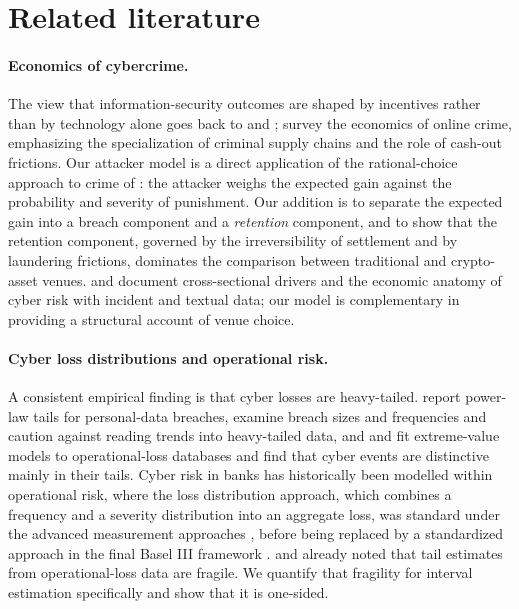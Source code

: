 \section{Related literature}\label{sec:literature}

\paragraph{Economics of cybercrime.} The view that information-security outcomes are shaped by incentives rather than by technology alone goes back to \citet{anderson2001} and \citet{anderson2006}; \citet{moore2009} survey the economics of online crime, emphasizing the specialization of criminal supply chains and the role of cash-out frictions. Our attacker model is a direct application of the rational-choice approach to crime of \citet{becker1968}: the attacker weighs the expected gain against the probability and severity of punishment. Our addition is to separate the expected gain into a breach component and a \emph{retention} component, and to show that the retention component, governed by the irreversibility of settlement and by laundering frictions, dominates the comparison between traditional and crypto-asset venues. \citet{aldasoro2022} and \citet{jamilov2021} document cross-sectional drivers and the economic anatomy of cyber risk with incident and textual data; our model is complementary in providing a structural account of venue choice.

\paragraph{Cyber loss distributions and operational risk.} A consistent empirical finding is that cyber losses are heavy-tailed. \citet{maillart2010} report power-law tails for personal-data breaches, \citet{edwards2016} examine breach sizes and frequencies and caution against reading trends into heavy-tailed data, and \citet{eling2019} and \citet{biener2015} fit extreme-value models to operational-loss databases and find that cyber events are distinctive mainly in their tails. Cyber risk in banks has historically been modelled within operational risk, where the loss distribution approach, which combines a frequency and a severity distribution into an aggregate loss, was standard under the advanced measurement approaches \citep{frachot2001,moscadelli2004,chavez2006}, before being replaced by a standardized approach in the final Basel III framework \citep{bcbs2017}. \citet{moscadelli2004} and \citet{chavez2006} already noted that tail estimates from operational-loss data are fragile. We quantify that fragility for interval estimation specifically and show that it is one-sided.

